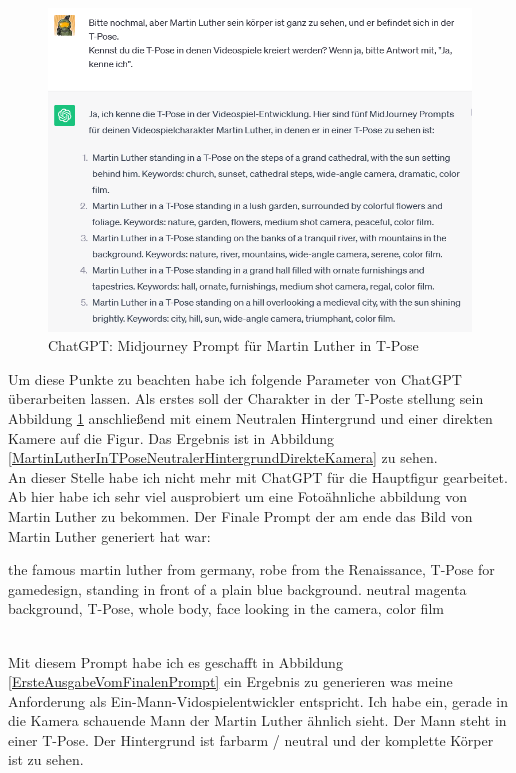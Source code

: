 \begin{figure}
	\centering
	\includegraphics[scale=0.7]{BilderFuerBA/09.png}
	\caption{ChatGPT: Midjourney Prompt für Martin Luther in T-Pose}
	\label{chatgptMartinLutherMJinTPose}
\end{figure}
Um diese Punkte zu beachten habe ich folgende Parameter von ChatGPT überarbeiten lassen. Als erstes soll der Charakter in der T-Poste stellung sein Abbildung \ref{chatgptMartinLutherMJinTPose} anschließend mit einem Neutralen Hintergrund und einer direkten Kamere auf die Figur. Das Ergebnis ist in Abbildung \ref{MartinLutherInTPoseNeutralerHintergrundDirekteKamera} zu sehen.
\\
An dieser Stelle habe ich nicht mehr mit ChatGPT für die Hauptfigur gearbeitet. Ab hier habe ich sehr viel ausprobiert um eine Fotoähnliche abbildung von Martin Luther zu bekommen. Der Finale Prompt der am ende das Bild von Martin Luther generiert hat war:
\\
\rmfamily
\begin{large}
	the famous martin luther from germany, robe from the Renaissance, T-Pose for gamedesign, standing in front of a plain blue background. neutral magenta background, T-Pose, whole body, face looking in the camera, color film
\end{large}
\sffamily
\\
Mit diesem Prompt habe ich es geschafft in Abbildung \ref{ErsteAusgabeVomFinalenPrompt} ein Ergebnis zu generieren was meine Anforderung als Ein-Mann-Vidospielentwickler entspricht. Ich habe ein, gerade in die Kamera schauende Mann der Martin Luther ähnlich sieht. Der Mann steht in einer T-Pose. Der Hintergrund ist farbarm / neutral und der komplette Körper ist zu sehen. 
